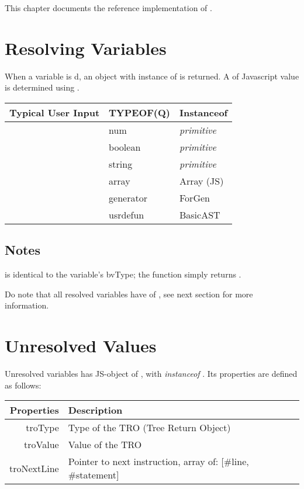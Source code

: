 This chapter documents the reference implementation of \tbas.

\section{Resolving Variables}

When a variable is d, an object with instance of  is returned. A  of Javascript value is determined using .

\begin{tabulary}{\textwidth}{R|LL}
Typical User Input & TYPEOF(\textbf{Q}) & Instanceof \\
\hline
{} & {\ttfamily num} & \emph{primitive} \\
 & {\ttfamily boolean} & \emph{primitive} \\
 & {\ttfamily string} & \emph{primitive} \\
 & {\ttfamily array} & Array (JS) \\
 & {\ttfamily generator} & ForGen \\
 & {\ttfamily usrdefun} & BasicAST \\
\end{tabulary}

\subsection*{Notes}
\begin{itemlist}
\item {} is identical to the variable's bvType; the function simply returns .
\item Do note that all resolved variables have  of , see next section for more information.
\end{itemlist}

\section{Unresolved Values}

Unresolved variables has JS-object of , with \emph{instanceof} . Its properties are defined as follows:

\begin{tabulary}{\textwidth}{RL}
Properties & Description \\
\hline
{\ttfamily troType} & Type of the TRO (Tree Return Object) \\
{\ttfamily troValue} & Value of the TRO \\
{\ttfamily troNextLine} & Pointer to next instruction, array of: [\#line, \#statement] \\
\end{tabulary}


